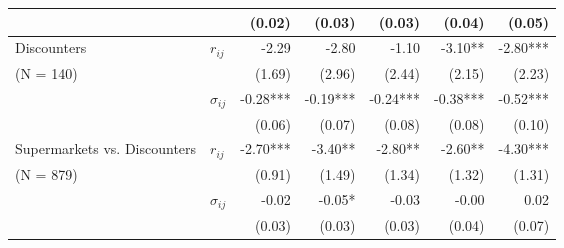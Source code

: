 \documentclass[english]{article}
\begin{document}
\begin{table}[hbtp]
\begin{threeparttable}
\begin{tabular}{llrrrrr}
          &       & (0.02) & (0.03) & (0.03) & (0.04) & (0.05) \\
\midrule
    \multicolumn{1}{l}{Discounters} & \multicolumn{1}{l}{$r_{ij}$} & -2.29 & -2.80 & -1.10 & -3.10** & -2.80*** \\
    \multicolumn{1}{l}{ (N = 140)} &       & (1.69) & (2.96) & (2.44) & (2.15) & (2.23) \\
          & \multicolumn{1}{l}{$\sigma_{ij}$} & -0.28*** & -0.19*** & -0.24*** & -0.38*** & -0.52*** \\
          &       & (0.06) & (0.07) & (0.08) & (0.08) & (0.10) \\
\midrule
    \multicolumn{1}{l}{Supermarkets vs. Discounters} & \multicolumn{1}{l}{$r_{ij}$} & -2.70*** & -3.40** & -2.80** & -2.60** & -4.30*** \\
    \multicolumn{1}{l}{(N = 879)} &       & (0.91) & (1.49) & (1.34) & (1.32) & (1.31) \\
          & \multicolumn{1}{l}{$\sigma_{ij}$} & -0.02 & -0.05* & -0.03 & -0.00 & 0.02 \\
          &       & (0.03) & (0.03) & (0.03) & (0.04) & (0.07) \\
\bottomrule
\bottomrule
\end{tabular}
\end{threeparttable}
\end{table}
\end{document}
